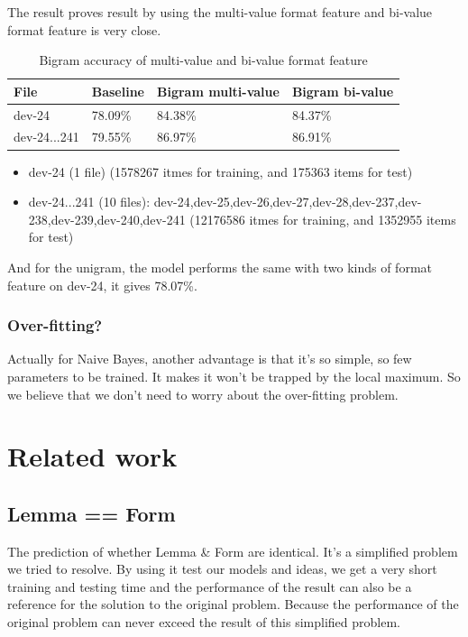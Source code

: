 \documentclass[a4paper]{article}
\begin{document}
The result proves result by using the multi-value format feature and bi-value format feature is very close.


\begin{table}[htp]
\centering
\begin{tabular}{|l|l|l|l|}
\hline
File           & Baseline  & Bigram multi-value & Bigram bi-value \\ \hline
dev-24         & 78.09\%    & 84.38\%            & 84.37\%         \\ \hline
dev-24...241   & 79.55\%    & 86.97\%            & 86.91\%         \\ \hline
\end{tabular}
\caption{Bigram accuracy of multi-value and bi-value format feature}
\label{bigram_nb}
\end{table}
\begin{itemize}
\item dev-24 (1 file) (1578267 itmes for training, and 175363 items for test)
\item dev-24...241 (10 files): dev-24,dev-25,dev-26,dev-27,dev-28,dev-237,dev-238,dev-239,dev-240,dev-241 (12176586 itmes for training, and 1352955 items for test)
\end{itemize}

And for the unigram, the model performs the same with two kinds of format feature on dev-24, it gives 78.07\%.


\subsubsection{Over-fitting?}
Actually for Naive Bayes, another advantage is that it's so simple, so few parameters to be trained. It makes it won't be trapped by the local maximum. So we believe that we don't need to worry about the over-fitting problem.


\section{Related work}
\subsection*{Lemma == Form}
The prediction of whether Lemma \& Form are identical. It's a simplified problem we tried to resolve. By using it test our models and ideas, we get a very short training and testing time and the performance of the result can also be a reference for the solution to the original problem. Because the performance of the original problem can never exceed the result of this simplified problem.
\end{document}
